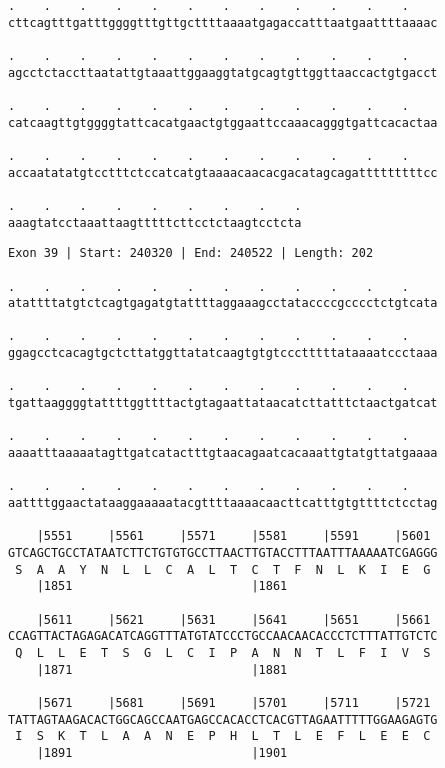 \documentclass{article}
\begin{document}
\begin{Verbatim}
.    .    .    .    .    .    .    .    .    .    .    .    
cttcagtttgatttggggtttgttgcttttaaaatgagaccatttaatgaattttaaaac
  
.    .    .    .    .    .    .    .    .    .    .    .    
agcctctaccttaatattgtaaattggaaggtatgcagtgttggttaaccactgtgacct
  
.    .    .    .    .    .    .    .    .    .    .    .    
catcaagttgtggggtattcacatgaactgtggaattccaaacagggtgattcacactaa
  
.    .    .    .    .    .    .    .    .    .    .    .    
accaatatatgtcctttctccatcatgtaaaacaacacgacatagcagatttttttttcc
  
.    .    .    .    .    .    .    .    .
aaagtatcctaaattaagtttttcttcctctaagtcctcta
\end{Verbatim}
\newpage
\begin{Verbatim}
Exon 39 | Start: 240320 | End: 240522 | Length: 202
 
.    .    .    .    .    .    .    .    .    .    .    .    
atattttatgtctcagtgagatgtattttaggaaagcctataccccgcccctctgtcata
  
.    .    .    .    .    .    .    .    .    .    .    .    
ggagcctcacagtgctcttatggttatatcaagtgtgtccctttttataaaatccctaaa
  
.    .    .    .    .    .    .    .    .    .    .    .    
tgattaaggggtattttggttttactgtagaattataacatcttatttctaactgatcat
  
.    .    .    .    .    .    .    .    .    .    .    .    
aaaatttaaaaatagttgatcatactttgtaacagaatcacaaattgtatgttatgaaaa
  
.    .    .    .    .    .    .    .    .    .    .    .    
aattttggaactataaggaaaaatacgttttaaaacaacttcatttgtgttttctcctag
  
    |5551     |5561     |5571     |5581     |5591     |5601 
GTCAGCTGCCTATAATCTTCTGTGTGCCTTAACTTGTACCTTTAATTTAAAAATCGAGGG
 S  A  A  Y  N  L  L  C  A  L  T  C  T  F  N  L  K  I  E  G 
    |1851                         |1861                     
  
    |5611     |5621     |5631     |5641     |5651     |5661 
CCAGTTACTAGAGACATCAGGTTTATGTATCCCTGCCAACAACACCCTCTTTATTGTCTC
 Q  L  L  E  T  S  G  L  C  I  P  A  N  N  T  L  F  I  V  S 
    |1871                         |1881                     
  
    |5671     |5681     |5691     |5701     |5711     |5721 
TATTAGTAAGACACTGGCAGCCAATGAGCCACACCTCACGTTAGAATTTTTGGAAGAGTG
 I  S  K  T  L  A  A  N  E  P  H  L  T  L  E  F  L  E  E  C 
    |1891                         |1901                     
  

\end{Verbatim}
\end{document}
